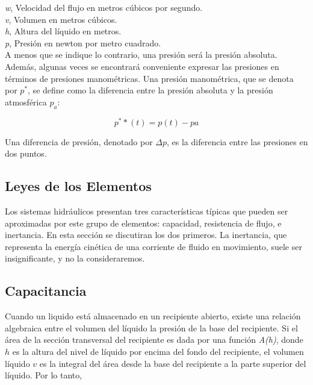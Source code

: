 \documentclass[a4paper,12pt,twoside]{proyectotanquesecci}
\begin{document}
\textit{w}, Velocidad del flujo en metros cúbicos por segundo.\\ 

\textit{v}, Volumen en metros cúbicos.\\ 

\textit{h}, Altura del líquido en metros.\\ 

\textit{p}, Presión en newton por metro cuadrado.\\

A menos que se indique lo contrario, una presión será la presión absoluta. Además,  algunas veces se encontrará conveniente expresar las presiones en términos de presiones manométricas. Una presión manométrica, que se denota por $p^{*}$, se define como la diferencia entre la presión absoluta y la presión atmosférica ${p_{a}}$:

\begin{equation}
p^{*}*(t)=p(t)-pa
\label{Ecu 1}
\end{equation}

Una diferencia de presión, denotado por $\Delta p$, es la diferencia entre las presiones en dos puntos. \\

\subsection{Leyes de los Elementos}

Los sistemas hidráulicos presentan tres características típicas que pueden ser aproximadas por este grupo de elementos: capacidad, resistencia de flujo, e inertancia. En esta sección se discutiran los dos primeros. La inertancia, que representa la energía cinética de una corriente de fluido en movimiento, suele ser insignificante, y no la consideraremos.\\

\subsection{Capacitancia}

Cuando un liquido está almacenado en un recipiente abierto, existe una relación algebraica entre el volumen del líquido la presión de la base del recipiente. Si el área de la sección transversal del recipiente es dada por una función \textit{A(h)}, donde $h$ es la altura del nivel de líquido por encima del fondo del recipiente, el volumen líquido $v$ es la integral del área desde la base del recipiente a la parte superior del líquido. 
Por lo tanto,
\end{document}
